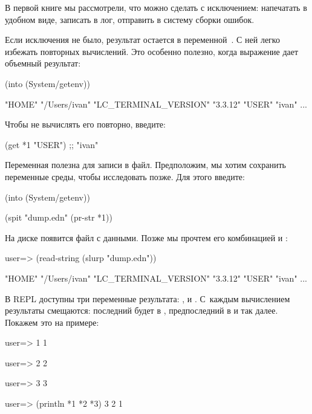 В первой книге мы рассмотрели, что можно сделать с исключением: напечатать в удобном виде, записать в лог, отправить в систему сборки ошибок.

Если исключения не было, результат остается в переменной~. С ней легко избежать повторных вычислений. Это особенно полезно, когда выражение дает объемный результат:

\begin{english}
  \begin{clojure}
(into {} (System/getenv))

{"HOME" "/Users/ivan"
 "LC_TERMINAL_VERSION" "3.3.12"
 "USER" "ivan"
 ...}
  \end{clojure}
\end{english}

Чтобы не вычислять его повторно, введите:

\begin{english}
  \begin{clojure}
(get *1 "USER")
;; "ivan"
  \end{clojure}
\end{english}

Переменная  полезна для записи в файл. Предположим, мы хотим сохранить переменные среды, чтобы исследовать позже. Для этого введите:

\begin{english}
  \begin{clojure}
(into {} (System/getenv))

(spit "dump.edn" (pr-str *1))
  \end{clojure}
\end{english}

На диске появится файл  с данными. Позже мы прочтем его комбинацией  и :

\begin{english}
  \begin{clojure}
user=> (read-string (slurp "dump.edn"))

{"HOME" "/Users/ivan"
 "LC_TERMINAL_VERSION" "3.3.12"
 "USER" "ivan"
 ...}
  \end{clojure}
\end{english}

В REPL доступны три переменные результата: ,  и . С~каждым вычислением результаты смещаются: последний будет в , предпоследний в  и так далее. Покажем это на примере:

\begin{english}
  \begin{clojure}
user=> 1
1

user=> 2
2

user=> 3
3

user=> (println *1 *2 *3)
3 2 1
  \end{clojure}
\end{english}

